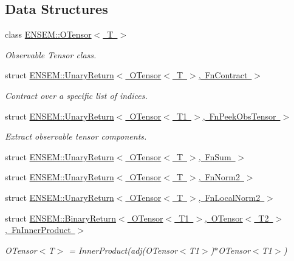 \subsection*{Data Structures}
\begin{DoxyCompactItemize}
\item 
class \mbox{\hyperlink{classENSEM_1_1OTensor}{E\+N\+S\+E\+M\+::\+O\+Tensor$<$ T $>$}}
\begin{DoxyCompactList}\small\item\em Observable Tensor class. \end{DoxyCompactList}\item 
struct \mbox{\hyperlink{structENSEM_1_1UnaryReturn_3_01OTensor_3_01T_01_4_00_01FnContract_01_4}{E\+N\+S\+E\+M\+::\+Unary\+Return$<$ O\+Tensor$<$ T $>$, Fn\+Contract $>$}}
\begin{DoxyCompactList}\small\item\em Contract over a specific list of indices. \end{DoxyCompactList}\item 
struct \mbox{\hyperlink{structENSEM_1_1UnaryReturn_3_01OTensor_3_01T1_01_4_00_01FnPeekObsTensor_01_4}{E\+N\+S\+E\+M\+::\+Unary\+Return$<$ O\+Tensor$<$ T1 $>$, Fn\+Peek\+Obs\+Tensor $>$}}
\begin{DoxyCompactList}\small\item\em Extract observable tensor components. \end{DoxyCompactList}\item 
struct \mbox{\hyperlink{structENSEM_1_1UnaryReturn_3_01OTensor_3_01T_01_4_00_01FnSum_01_4}{E\+N\+S\+E\+M\+::\+Unary\+Return$<$ O\+Tensor$<$ T $>$, Fn\+Sum $>$}}
\item 
struct \mbox{\hyperlink{structENSEM_1_1UnaryReturn_3_01OTensor_3_01T_01_4_00_01FnNorm2_01_4}{E\+N\+S\+E\+M\+::\+Unary\+Return$<$ O\+Tensor$<$ T $>$, Fn\+Norm2 $>$}}
\item 
struct \mbox{\hyperlink{structENSEM_1_1UnaryReturn_3_01OTensor_3_01T_01_4_00_01FnLocalNorm2_01_4}{E\+N\+S\+E\+M\+::\+Unary\+Return$<$ O\+Tensor$<$ T $>$, Fn\+Local\+Norm2 $>$}}
\item 
struct \mbox{\hyperlink{structENSEM_1_1BinaryReturn_3_01OTensor_3_01T1_01_4_00_01OTensor_3_01T2_01_4_00_01FnInnerProduct_01_4}{E\+N\+S\+E\+M\+::\+Binary\+Return$<$ O\+Tensor$<$ T1 $>$, O\+Tensor$<$ T2 $>$, Fn\+Inner\+Product $>$}}
\begin{DoxyCompactList}\small\item\em O\+Tensor$<$\+T$>$ = Inner\+Product(adj(\+O\+Tensor$<$\+T1$>$)$\ast$\+O\+Tensor$<$\+T1$>$) \end{DoxyCompactList}\item 

\end{DoxyCompactItemize}
